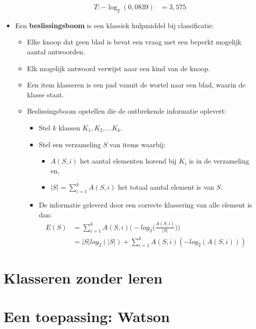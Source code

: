 \documentclass{report}
\begin{document}
\begin{itemize}
\begin{itemize}
\begin{equation*}
\begin{split}
				T: -\log_2(0,0839) & = 3,575
			\end{split}
		\end{equation*}
	\end{itemize}
	\item Een \textbf{beslissingsboom} is een klassiek hulpmiddel bij classificatie:
	\begin{itemize}
		\item Elke knoop dat geen blad is bevat een vraag met een beperkt mogelijk aantal antwoorden.
		\item Elk mogelijk antwoord verwijst naar een kind van de knoop.
		\item Een item klasseren is een pad vanuit de wortel naar een blad, waarin de klasse staat.
		\item Beslissingsboom opstellen die de ontbrekende informatie oplevert:
		\begin{itemize}
			\item Stel $k$ klassen $K_1, K_2, ... K_k$.
			\item Stel een verzameling $S$ van items waarbij:
			\begin{itemize}
				\item $A(S, i)$ het aantal elementen horend bij $K_i$ is in de verzameling en,
				\item $|S| = \sum_{i = 1}^k A(S,i)$ het totaal aantal element is van $S$.
			\end{itemize} 
			\item De informatie geleverd door een correcte klassering van alle element is dan:
			\begin{equation*}
				\begin{split}
					E(S) & = \sum_{i = 1}^{k} A(S, i) \bigg(-log_2 \bigg( \frac{A(S, i)}{|S|}\bigg) \bigg) \\
					     & = |S|log_2(|S|) +  \sum_{i = 1}^{k} A(S, i)(-log_2(A(S, i)))
				\end{split}
			\end{equation*}
		\end{itemize}
	\end{itemize}
\end{itemize}
\section{Klasseren zonder leren}
\section{Een toepassing: Watson}
\end{document}
